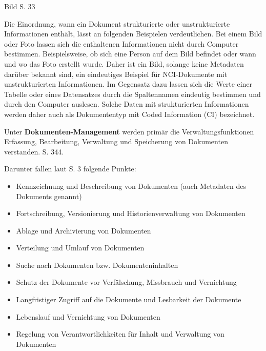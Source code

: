 \begin{center}
Bild \cite{DMS08} S. 33
\end{center}

Die Einordnung, wann ein Dokument strukturierte oder unstrukturierte Informationen enthält, lässt an folgenden Beispielen verdeutlichen.
Bei einem Bild oder Foto lassen sich die enthaltenen Informationen nicht durch Computer bestimmen.
Beispielsweise, ob sich eine Person auf dem Bild befindet oder wann und wo das Foto erstellt wurde.
Daher ist ein Bild, solange keine Metadaten darüber bekannt sind, ein eindeutiges Beispiel für \gls{NCI}-Dokumente mit unstrukturierten Informationen.
Im Gegensatz dazu lassen sich die Werte einer Tabelle oder eines Datensatzes durch die Spaltennamen eindeutig bestimmen und durch den Computer auslesen.
Solche Daten mit strukturierten Informationen werden daher auch als Dokumententyp mit Coded Information (\gls{CI}) bezeichnet.

Unter \textbf{Dokumenten-Management} werden primär die Verwaltungsfunktionen Erfassung, Bearbeitung, Verwaltung und Speicherung von Dokumenten verstanden. \cite{DMS08} S. 344.

Darunter fallen laut \cite{DMS08} S. 3 folgende Punkte:

\begin{itemize}
\item Kennzeichnung und Beschreibung von Dokumenten (auch Metadaten des Dokuments genannt) 
\item Fortschreibung, Versionierung und Historienverwaltung von Dokumenten
\item Ablage und Archivierung von Dokumenten
\item Verteilung und Umlauf von Dokumenten
\item Suche nach Dokumenten bzw. Dokumenteninhalten
\item Schutz der Dokumente vor Verfälschung, Missbrauch und Vernichtung
\item Langfristiger Zugriff auf die Dokumente und Lesbarkeit der Dokumente
\item Lebenslauf und Vernichtung von Dokumenten
\item Regelung von Verantwortlichkeiten für Inhalt und Verwaltung von Dokumenten
\end{itemize}

